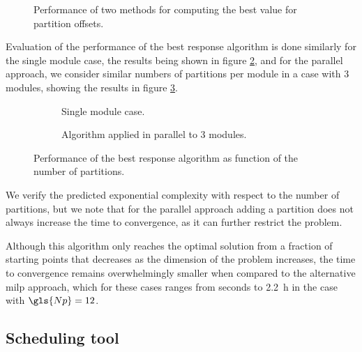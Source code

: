 \documentclass[main.tex]{subfiles}
\begin{document}
\begin{figure}[htb]
    \centering
    \centering
    \resizebox{0.7\linewidth}{!}{}
    \caption{Performance of two methods for computing the best value for partition offsets.}
    \label{fig:best-value-results}
\end{figure}

Evaluation of the performance of the best response algorithm is done similarly for the single module case, the results being shown in figure \ref{fig:best-response-single}, and for the parallel approach, we consider similar numbers of partitions per module in a case with \num{3} modules, showing the results in figure \ref{fig:best-response-multi}.
\begin{figure}[htb]
    \centering
    \begin{subfigure}{\linewidth}
        \centering
        \caption{Single module case.}
        \label{fig:best-response-single}
        \resizebox{0.7\linewidth}{!}{}
    \end{subfigure}

    \begin{subfigure}{\linewidth}
        \centering
        \caption{Algorithm applied in parallel to 3 modules.}
        \label{fig:best-response-multi}
        \resizebox{0.7\linewidth}{!}{}
    \end{subfigure}
    \caption{Performance of the best response algorithm as function of the number of partitions.}
    \label{fig:best-response-results}
\end{figure}
We verify the predicted exponential complexity with respect to the number of partitions, but we note that for the parallel approach adding a partition does not always increase the time to convergence, as it can further restrict the problem.

Although this algorithm only reaches the optimal solution from a fraction of starting points that decreases as the dimension of the problem increases, the time to convergence remains overwhelmingly smaller when compared to the alternative \gls{milp} approach, which for these cases ranges from seconds to \SI{2.2}{\hour} in the case with $\gls{Np}=12$.

\subsection{Scheduling tool}
\label{sec:complete-tool}
\end{document}
